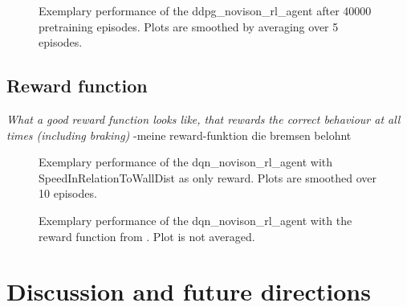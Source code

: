\begin{figure}[h]
	{%
		\setlength{\fboxsep}{0pt}%
		\setlength{\fboxrule}{1pt}%
	}%
	\centering
	\caption[Exemplary performance of the ddpg\_novison\_rl\_agent after 40000 pretrain episodes]{Exemplary performance of the ddpg\_novison\_rl\_agent after 40000 pretraining episodes. Plots are smoothed by averaging over 5 episodes.}
	\label{fig:ddpg_incorpPre}
\end{figure}

\section{Reward function}

\textit{What a good reward function looks like, that rewards the \textit{correct} behaviour at all times (including braking)}
-meine reward-funktion die bremsen belohnt

\begin{figure}[h]
	{%
		\setlength{\fboxsep}{0pt}%
		\setlength{\fboxrule}{1pt}%
	}%
	\centering
	\caption[Exemplary performance of the dqn\_novison\_rl\_agent with SpeedInRelationToWallDist as only reward.]{Exemplary performance of the dqn\_novison\_rl\_agent with SpeedInRelationToWallDist as only reward. Plots are smoothed over 10 episodes.}
	\label{fig:dqnrewardinrelationtowall}
\end{figure}


\begin{figure}[h]
	{%
		\setlength{\fboxsep}{0pt}%
		\setlength{\fboxrule}{1pt}%
	}%
	\centering
	\caption[Exemplary performance of the dqn\_novison\_rl\_agent with the reward function from \cite{lillicrap_continuous_2015}]{Exemplary performance of the dqn\_novison\_rl\_agent with the reward function from \cite{lillicrap_continuous_2015}. Plot is not averaged.}
	\label{fig:dqnrewardspeedstuff}
\end{figure}



\chapter{Discussion and future directions}

